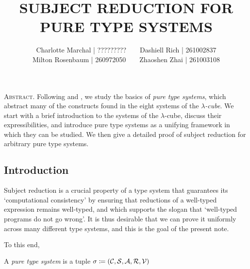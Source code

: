 \documentclass[reqno, twoside]{article}
\begin{document}
    \title{\textbf{\normalsize\MakeUppercase{Subject Reduction for Pure Type Systems}}}
    \author{\small Charlotte Marchal | ?????????\ \ \ \ Dashiell Rich | 261002837\\\small Milton Rosenbaum | 260972050\ \ \ \ Zhaoshen Zhai | 261003108}
    \date{}
    \maketitle

    \begin{center}
        \vspace{-0.3in}
        \begin{minipage}{0.85\textwidth}
            {\footnotesize{\textsc{Abstract.}} Following \cite{GN91} and \cite{Bar91}, we study the basics of \textit{pure type systems}, which abstract many of the constructs found in the eight systems of the \textit{$\lambda$-cube}. We start with a brief introduction to the systems of the $\lambda$-cube, discuss their expressibilities, and introduce pure type systems as a unifying framework in which they can be studied. We then give a detailed proof of subject reduction for arbitrary pure type systems.}
        \end{minipage}
    \end{center}

    \subsection*{Introduction}

    Subject reduction is a crucial property of a type system that guarantees its `computational consistency' by ensuring that reductions of a well-typed expression remains well-typed, and which supports the slogan that `well-typed programs do not go wrong'. It is thus desirable that we can prove it uniformly across many different type systems, and this is the goal of the present note.

    To this end, 

    \begin{definition}
        A \textit{pure type system} is a tuple $\sigma\coloneqq(\mathcal{C},\mathcal{S},\mathcal{A},\mathcal{R},\mathcal{V})$ \TODO
    \end{definition}
\end{document}
